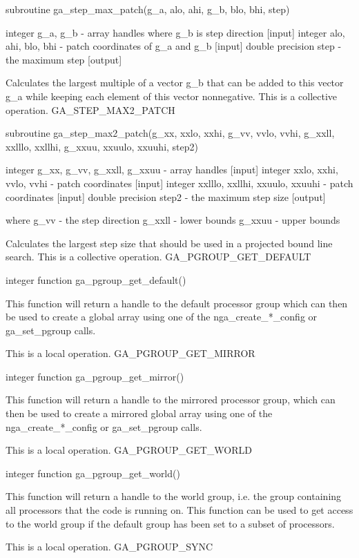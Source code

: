 subroutine ga\_step\_max\_patch(g\_a, alo, ahi, g\_b, blo, bhi, step)

integer g\_a, g\_b - array handles where g\_b is step direction {[}input{]}
integer alo, ahi, blo, bhi - patch coordinates of g\_a and g\_b {[}input{]}
double precision step - the maximum step {[}output{]}

Calculates the largest multiple of a vector g\_b that can be added
to this vector g\_a while keeping each element of this vector nonnegative.
This is a collective operation. GA\_STEP\_MAX2\_PATCH

subroutine ga\_step\_max2\_patch(g\_xx, xxlo, xxhi, g\_vv, vvlo, vvhi,
g\_xxll, xxlllo, xxllhi, g\_xxuu, xxuulo, xxuuhi, step2)

integer g\_xx, g\_vv, g\_xxll, g\_xxuu - array handles {[}input{]}
integer xxlo, xxhi, vvlo, vvhi - patch coordinates {[}input{]} integer
xxlllo, xxllhi, xxuulo, xxuuhi - patch coordinates {[}input{]} double
precision step2 - the maximum step size {[}output{]}

where g\_vv - the step direction g\_xxll - lower bounds g\_xxuu -
upper bounds

Calculates the largest step size that should be used in a projected
bound line search. This is a collective operation. GA\_PGROUP\_GET\_DEFAULT

integer function ga\_pgroup\_get\_default()

This function will return a handle to the default processor group
which can then be used to create a global array using one of the nga\_create\_{*}\_config
or ga\_set\_pgroup calls.

This is a local operation. GA\_PGROUP\_GET\_MIRROR

integer function ga\_pgroup\_get\_mirror()

This function will return a handle to the mirrored processor group,
which can then be used to create a mirrored global array using one
of the nga\_create\_{*}\_config or ga\_set\_pgroup calls.

This is a local operation. GA\_PGROUP\_GET\_WORLD

integer function ga\_pgroup\_get\_world()

This function will return a handle to the world group, i.e. the group
containing all processors that the code is running on. This function
can be used to get access to the world group if the default group
has been set to a subset of processors.

This is a local operation. GA\_PGROUP\_SYNC


